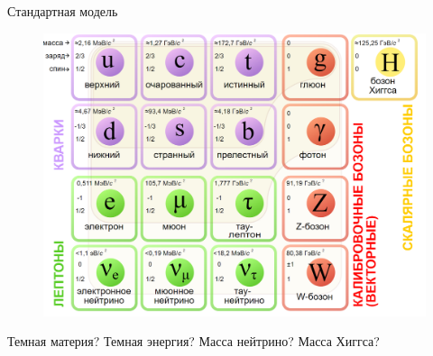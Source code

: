 \documentclass[hyperref={colorlinks,citecolor=blue,linkcolor=blue,urlcolor=blue}]{beamer}
\begin{document}
\begin{frame}{Стандартная модель}
    \begin{figure}[H]
        \centering
        \includegraphics[width=0.7\framewidth]{img/Standard_Model_of_Elementary_Particles_ru.svg.png}
    \end{figure}
    Темная материя? Темная энергия? Масса нейтрино? Масса Хиггса?

\end{frame}
\end{document}
